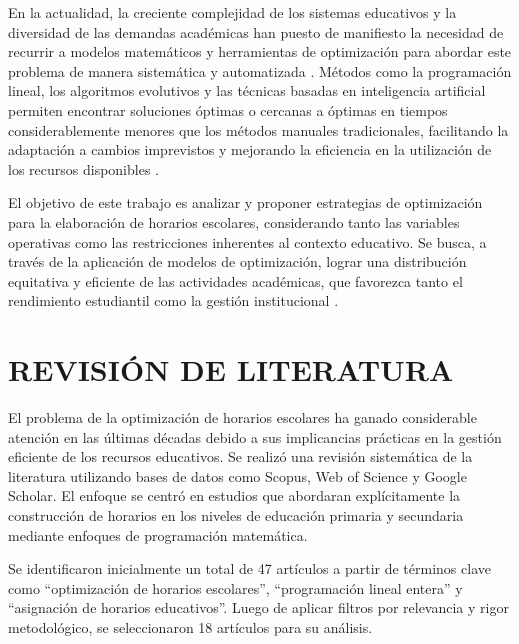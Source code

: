 \documentclass[12pt]{article}
\begin{document}
En la actualidad, la creciente complejidad de los sistemas educativos y la diversidad de las demandas académicas han puesto de manifiesto la necesidad de recurrir a modelos matemáticos y herramientas de optimización para abordar este problema de manera sistemática y automatizada \cite{ref4,ref5}. Métodos como la programación lineal, los algoritmos evolutivos y las técnicas basadas en inteligencia artificial permiten encontrar soluciones óptimas o cercanas a óptimas en tiempos considerablemente menores que los métodos manuales tradicionales, facilitando la adaptación a cambios imprevistos y mejorando la eficiencia en la utilización de los recursos disponibles \cite{ref5,ref6}.

El objetivo de este trabajo es analizar y proponer estrategias de optimización para la elaboración de horarios escolares, considerando tanto las variables operativas como las restricciones inherentes al contexto educativo. Se busca, a través de la aplicación de modelos de optimización, lograr una distribución equitativa y eficiente de las actividades académicas, que favorezca tanto el rendimiento estudiantil como la gestión institucional \cite{ref5,ref6}.


\section{REVISIÓN DE LITERATURA}

El problema de la optimización de horarios escolares ha ganado considerable atención en las últimas décadas debido a sus implicancias prácticas en la gestión eficiente de los recursos educativos. Se realizó una revisión sistemática de la literatura utilizando bases de datos como Scopus, Web of Science y Google Scholar. El enfoque se centró en estudios que abordaran explícitamente la construcción de horarios en los niveles de educación primaria y secundaria mediante enfoques de programación matemática.

Se identificaron inicialmente un total de 47 artículos a partir de términos clave como ``optimización de horarios escolares'', ``programación lineal entera'' y ``asignación de horarios educativos''. Luego de aplicar filtros por relevancia y rigor metodológico, se seleccionaron 18 artículos para su análisis. 
\end{document}
